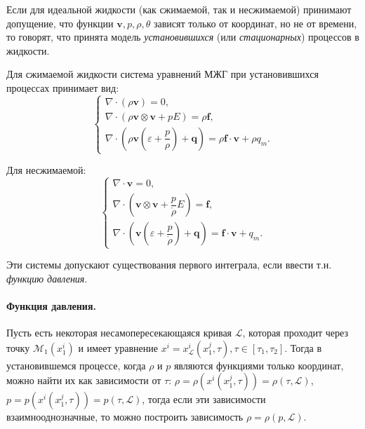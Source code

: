 
\begin{definition}
  Если для идеальной жидкости (как сжимаемой, так и несжимаемой) принимают допущение, 
  что функции $\mathbf{v}, p, \rho, \theta$ зависят только от координат, но не от времени, то
  говорят, что принята модель \emph{установившихся} (или \emph{стационарных}) процессов в
  жидкости.
\end{definition}

Для сжимаемой жидкости система уравнений МЖГ при установившихся процессах принимает вид:
\[
  \begin{cases}
    \nabla \cdot (\rho \mathbf{v}) = 0, \\
    \nabla \cdot \left( \rho \mathbf{v} \otimes \mathbf{v} + p E \right) = \rho \mathbf{f}, \\
    \nabla \cdot \left( \rho \mathbf{v} (\varepsilon + \dfrac{p}{\rho}) + \mathbf{q} \right) = \rho \mathbf{f} \cdot \mathbf{v} + \rho q_m.
  \end{cases}
\]

Для несжимаемой:
\[
  \begin{cases}
    \nabla \cdot \mathbf{v} = 0, \\
    \nabla \cdot \left( \mathbf{v} \otimes \mathbf{v} + \dfrac{p}{\mathring{\rho}} E \right) = \mathbf{f}, \\
    \nabla \cdot \left( \mathbf{v} \left( \varepsilon + \dfrac{p}{\mathring{\rho}} \right) + \mathbf{q} \right) = \mathbf{f} \cdot \mathbf{v} + q_m.
  \end{cases}
\]

Эти системы допускают существования первого интеграла, если ввести т.н. \emph{функцию давления}.

\paragraph{Функция давления.}
Пусть есть некоторая несамопересекающаяся кривая $\mathcal{L}$, которая проходит через
точку $\mathcal{M}_1 ( x^i_1 )$ и имеет уравнение
$x^i = x^i_\mathcal{L} (x^j_1, \tau), \tau \in [\tau_1, \tau_2]$. Тогда в установившемся
процессе, когда $\rho$ и $p$ являются функциями только координат, можно найти их как
зависимости от $\tau$: $\rho = \rho(x^i(x^j_1, \tau)) = \rho(\tau, \mathcal{L})$,
$p = p(x^i(x^j_1, \tau)) = p(\tau, \mathcal{L})$, тогда если эти зависимости взаимнооднозначные,
то можно построить зависимость $\rho = \rho(p, \mathcal{L})$.

